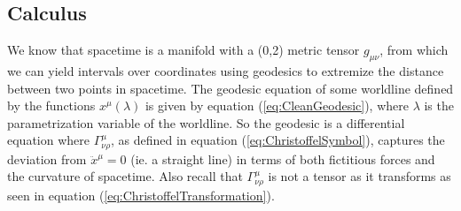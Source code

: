 \documentclass{article}
\begin{document}
 		\subsection{Calculus}
 			We know that spacetime is a manifold with a (0,2) metric tensor $g_{\mu\nu}$, from which we can yield intervals over coordinates using geodesics to extremize the distance between two points in spacetime. The geodesic equation of some worldline defined by the functions $x^\mu (\lambda)$ is given by equation (\ref{eq:CleanGeodesic}), where $\lambda$ is the parametrization variable of the worldline. So the geodesic is a differential equation where $\Gamma_{\nu\rho}^\mu$, as defined in equation (\ref{eq:ChristoffelSymbol}), captures the deviation from $\ddot{x}^\mu = 0$ (ie. a straight line) in terms of both fictitious forces and the curvature of spacetime. Also recall that $\Gamma_{\nu\rho}^\mu$ is not a tensor as it transforms as seen in equation (\ref{eq:ChristoffelTransformation}).
 			
\end{document}
